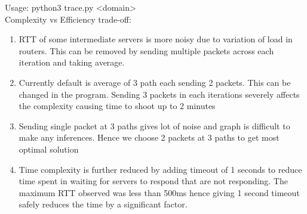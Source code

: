\documentclass[]{assignment}
\begin{document}
    \pagebreak
    Usage: python3 trace.py <domain>
    \\
    Complexity vs Efficiency trade-off:
    \begin{enumerate}
        \item RTT of some intermediate servers is more noisy due to variation of load in routers. This can be removed by sending multiple packets across each iteration and taking average.
        \item Currently default is average of 3 path each sending 2 packets. This can be changed in the program. Sending 3 packets in each iterations severely affects the complexity causing time to shoot up to 2 minutes
        \item Sending single packet at 3 paths gives lot of noise and graph is difficult to make any inferences. Hence we choose 2 packets at 3 paths to get most optimal solution
        \item Time complexity is further reduced by adding timeout of 1 seconds to reduce time spent in waiting for servers to respond that are not responding. The maximum RTT observed was less than 500ms hence giving 1 second timeout safely reduces the time by a significant factor.
    \end{enumerate}
    

\listoffigures
\lstlistoflistings
\end{document}
